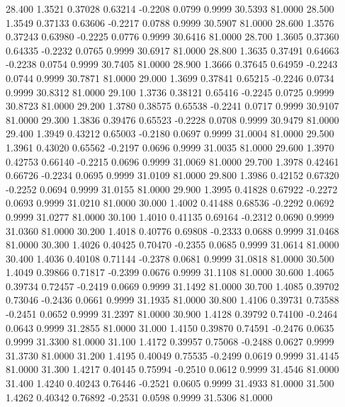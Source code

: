   28.400   1.3521   0.37028   0.63214  -0.2208   0.0799   0.9999  30.5393  81.0000
  28.500   1.3549   0.37133   0.63606  -0.2217   0.0788   0.9999  30.5907  81.0000
  28.600   1.3576   0.37243   0.63980  -0.2225   0.0776   0.9999  30.6416  81.0000
  28.700   1.3605   0.37360   0.64335  -0.2232   0.0765   0.9999  30.6917  81.0000
  28.800   1.3635   0.37491   0.64663  -0.2238   0.0754   0.9999  30.7405  81.0000
  28.900   1.3666   0.37645   0.64959  -0.2243   0.0744   0.9999  30.7871  81.0000
  29.000   1.3699   0.37841   0.65215  -0.2246   0.0734   0.9999  30.8312  81.0000
  29.100   1.3736   0.38121   0.65416  -0.2245   0.0725   0.9999  30.8723  81.0000
  29.200   1.3780   0.38575   0.65538  -0.2241   0.0717   0.9999  30.9107  81.0000
  29.300   1.3836   0.39476   0.65523  -0.2228   0.0708   0.9999  30.9479  81.0000
  29.400   1.3949   0.43212   0.65003  -0.2180   0.0697   0.9999  31.0004  81.0000
  29.500   1.3961   0.43020   0.65562  -0.2197   0.0696   0.9999  31.0035  81.0000
  29.600   1.3970   0.42753   0.66140  -0.2215   0.0696   0.9999  31.0069  81.0000
  29.700   1.3978   0.42461   0.66726  -0.2234   0.0695   0.9999  31.0109  81.0000
  29.800   1.3986   0.42152   0.67320  -0.2252   0.0694   0.9999  31.0155  81.0000
  29.900   1.3995   0.41828   0.67922  -0.2272   0.0693   0.9999  31.0210  81.0000
  30.000   1.4002   0.41488   0.68536  -0.2292   0.0692   0.9999  31.0277  81.0000
  30.100   1.4010   0.41135   0.69164  -0.2312   0.0690   0.9999  31.0360  81.0000
  30.200   1.4018   0.40776   0.69808  -0.2333   0.0688   0.9999  31.0468  81.0000
  30.300   1.4026   0.40425   0.70470  -0.2355   0.0685   0.9999  31.0614  81.0000
  30.400   1.4036   0.40108   0.71144  -0.2378   0.0681   0.9999  31.0818  81.0000
  30.500   1.4049   0.39866   0.71817  -0.2399   0.0676   0.9999  31.1108  81.0000
  30.600   1.4065   0.39734   0.72457  -0.2419   0.0669   0.9999  31.1492  81.0000
  30.700   1.4085   0.39702   0.73046  -0.2436   0.0661   0.9999  31.1935  81.0000
  30.800   1.4106   0.39731   0.73588  -0.2451   0.0652   0.9999  31.2397  81.0000
  30.900   1.4128   0.39792   0.74100  -0.2464   0.0643   0.9999  31.2855  81.0000
  31.000   1.4150   0.39870   0.74591  -0.2476   0.0635   0.9999  31.3300  81.0000
  31.100   1.4172   0.39957   0.75068  -0.2488   0.0627   0.9999  31.3730  81.0000
  31.200   1.4195   0.40049   0.75535  -0.2499   0.0619   0.9999  31.4145  81.0000
  31.300   1.4217   0.40145   0.75994  -0.2510   0.0612   0.9999  31.4546  81.0000
  31.400   1.4240   0.40243   0.76446  -0.2521   0.0605   0.9999  31.4933  81.0000
  31.500   1.4262   0.40342   0.76892  -0.2531   0.0598   0.9999  31.5306  81.0000
